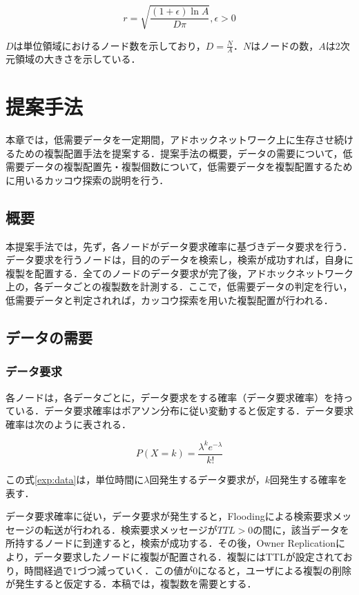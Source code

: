 \documentclass[11pt]{jreport}
\begin{document}
\begin{equation}
r=\sqrt{ \frac{(1+\epsilon)\ln{A}}{D\pi}}, \epsilon>0 \label{exp:r}
\end{equation}

$D$は単位領域におけるノード数を示しており，$D=\frac{N}{A}$．$N$はノードの数，$A$は2次元領域の大きさを示している．



\chapter{提案手法}
本章では，低需要データを一定期間，アドホックネットワーク上に生存させ続けるための複製配置手法を提案する．提案手法の概要，データの需要について，低需要データの複製配置先・複製個数について，低需要データを複製配置するために用いるカッコウ探索の説明を行う．

\section{概要}
本提案手法では，先ず，各ノードがデータ要求確率に基づきデータ要求を行う．データ要求を行うノードは，目的のデータを検索し，検索が成功すれば，自身に複製を配置する．全てのノードのデータ要求が完了後，アドホックネットワーク上の，各データごとの複製数を計測する．ここで，低需要データの判定を行い，低需要データと判定されれば，カッコウ探索を用いた複製配置が行われる．

\section{データの需要}
\subsection{データ要求}
各ノードは，各データごとに，データ要求をする確率（データ要求確率）を持っている．データ要求確率はポアソン分布に従い変動すると仮定する．データ要求確率は次のように表される．

\begin{equation}
P(X=k)=\frac{\lambda^{k}e^{-\lambda}}{k!} \label{exp:data}
\end{equation}

この式\ref{exp:data}は，単位時間に$\lambda$回発生するデータ要求が，$k$回発生する確率を表す．
\par データ要求確率に従い，データ要求が発生すると，Floodingによる検索要求メッセージの転送が行われる．検索要求メッセージが$TTL>0$の間に，該当データを所持するノードに到達すると，検索が成功する．その後，Owner Replicationにより，データ要求したノードに複製が配置される．複製にはTTLが設定されており，時間経過で1づつ減っていく．この値が0になると，ユーザによる複製の削除が発生すると仮定する．本稿では，複製数を需要とする．
\end{document}
